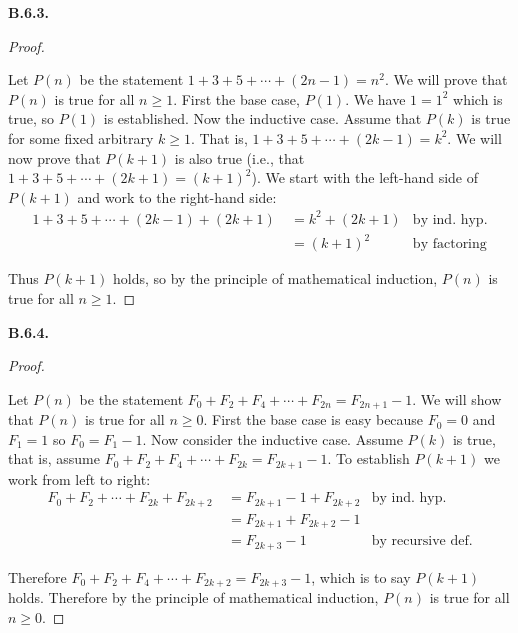 \documentclass[10pt,]{book}
\theoremstyle{plain}
\theoremstyle{definition}
\theoremstyle{definition}
\theoremstyle{definition}
\theoremstyle{definition}
\numberwithin{equation}{chapter}
\newcommand{\amp}{&}
\begin{document}
\par\smallskip
\noindent\textbf{B.6.3.} \begin{proof}\hypertarget{proof-43}{}
\hypertarget{p-2155}{}%
Let \(P(n)\) be the statement \(1+3 +5 + \cdots + (2n-1) = n^2\). We will prove that \(P(n)\) is true for all \(n \ge 1\). First the base case, \(P(1)\). We have \(1 = 1^2\) which is true, so \(P(1)\) is established. Now the inductive case. Assume that \(P(k)\) is true for some fixed arbitrary \(k \ge 1\). That is, \(1 + 3 + 5 + \cdots + (2k-1) = k^2\). We will now prove that \(P(k+1)\) is also true (i.e., that \(1 + 3 + 5 + \cdots + (2k+1) = (k+1)^2\)). We start with the left-hand side of \(P(k+1)\) and work to the right-hand side:%
\begin{align*}
1 + 3 + 5 + \cdots + (2k-1) + (2k+1) ~ \amp = k^2 + (2k+1) \amp \text{by ind. hyp.}\\
\amp = (k+1)^2 \amp \text{by factoring}
\end{align*}
%
\par
\hypertarget{p-2156}{}%
Thus \(P(k+1)\) holds, so by the principle of mathematical induction, \(P(n)\) is true for all \(n \ge 1\).%
\end{proof}
\par\smallskip
\noindent\textbf{B.6.4.} \begin{proof}\hypertarget{proof-44}{}
\hypertarget{p-2158}{}%
Let \(P(n)\) be the statement \(F_0 + F_2 + F_4 + \cdots + F_{2n} = F_{2n+1} - 1\). We will show that \(P(n)\) is true for all \(n \ge 0\). First the base case is easy because \(F_0 = 0\) and \(F_1 = 1\) so \(F_0 = F_1 - 1\). Now consider the inductive case. Assume \(P(k)\) is true, that is, assume \(F_0 + F_2 + F_4 + \cdots + F_{2k} = F_{2k+1} - 1\). To establish \(P(k+1)\) we work from left to right:%
\begin{align*}
F_0 + F_2 + \cdots + F_{2k} + F_{2k+2} ~ \amp = F_{2k+1} - 1 + F_{2k+2} \amp \text{by ind. hyp.}\\
\amp = F_{2k+1} + F_{2k+2} - 1 \amp\\
\amp = F_{2k+3} - 1 \amp \text{by recursive def.}
\end{align*}
%
\par
\hypertarget{p-2159}{}%
Therefore \(F_0 + F_2 + F_4 + \cdots + F_{2k+2} = F_{2k+3} - 1\), which is to say \(P(k+1)\) holds. Therefore by the principle of mathematical induction, \(P(n)\) is true for all \(n \ge 0\).%
\end{proof}
\par\smallskip
\end{document}

